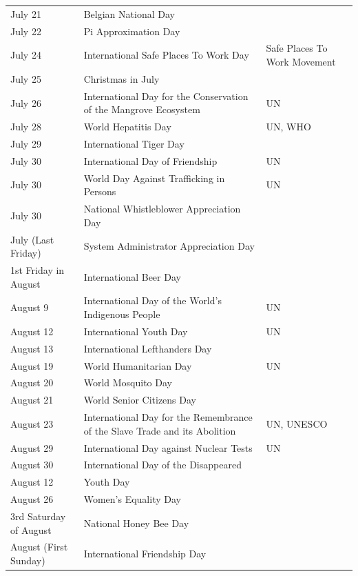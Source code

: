 \documentclass[
  openany]{book}
\begin{document}
\begin{longtable}[t]{>{\raggedright\arraybackslash}p{8em}>{\raggedright\arraybackslash}p{18em}>{\raggedright\arraybackslash}p{10em}}
\rowcolor{gray!6}  July 21 & Belgian National Day & \\
\addlinespace
July 22 & Pi Approximation Day & \\
\rowcolor{gray!6}  July 24 & International Safe Places To Work Day & Safe Places To Work Movement\\
July 25 & Christmas in July & \\
\rowcolor{gray!6}  July 26 & International Day for the Conservation of the Mangrove Ecosystem & UN\\
July 28 & World Hepatitis Day & UN, WHO\\
\addlinespace
\rowcolor{gray!6}  July 29 & International Tiger Day & \\
July 30 & International Day of Friendship & UN\\
\rowcolor{gray!6}  July 30 & World Day Against Trafficking in Persons & UN\\
July 30 & National Whistleblower Appreciation Day & \\
\rowcolor{gray!6}  July (Last Friday) & System Administrator Appreciation Day & \\
\addlinespace
1st Friday in August & International Beer Day & \\
\rowcolor{gray!6}  August 9 & International Day of the World's Indigenous People & UN\\
August 12 & International Youth Day & UN\\
\rowcolor{gray!6}  August 13 & International Lefthanders Day & \\
August 19 & World Humanitarian Day & UN\\
\addlinespace
\rowcolor{gray!6}  August 20 & World Mosquito Day & \\
August 21 & World Senior Citizens Day & \\
\rowcolor{gray!6}  August 23 & International Day for the Remembrance of the Slave Trade and its Abolition & UN, UNESCO\\
August 29 & International Day against Nuclear Tests & UN\\
\rowcolor{gray!6}  August 30 & International Day of the Disappeared & \\
\addlinespace
August 12 & Youth Day & \\
\rowcolor{gray!6}  August 26 & Women's Equality Day & \\
3rd Saturday of August & National Honey Bee Day & \\
\rowcolor{gray!6}  August (First Sunday) & International Friendship Day & \\

\end{longtable}
\end{document}
